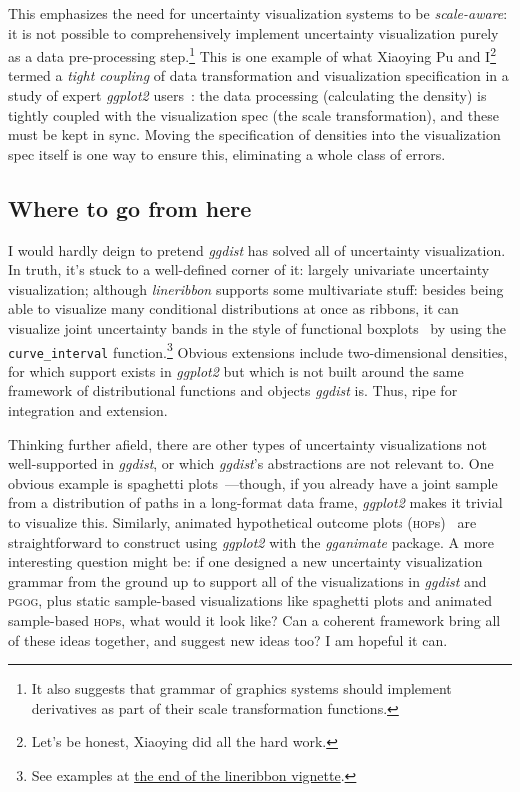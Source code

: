 \documentclass[journal]{vgtc}              %
\begin{document}
This emphasizes the need for uncertainty visualization systems to be \textit{scale-aware}: it is not possible to comprehensively implement uncertainty visualization purely as a data pre-processing step.\footnote{It also suggests that grammar of graphics systems should implement derivatives as part of their scale transformation functions.} This is one example of what Xiaoying Pu and I\footnote{Let's be honest, Xiaoying did all the hard work.} termed a \textit{tight coupling} of data transformation and visualization specification in a study of expert \textit{ggplot2} users~\cite{pu2023inpractice}: the data processing (calculating the density) is tightly coupled with the visualization spec (the scale transformation), and these must be kept in sync. Moving the specification of densities into the visualization spec itself is one way to ensure this, eliminating a whole class of errors. 


\subsection{Where to go from here}

I would hardly deign to pretend \textit{ggdist} has solved all of uncertainty visualization. In truth, it's stuck to a well-defined corner of it: largely univariate uncertainty visualization; although \textit{lineribbon} supports some multivariate stuff: besides being able to visualize many conditional distributions at once as ribbons, it can visualize joint uncertainty bands in the style of functional boxplots~\cite{sun2011functional,mirzargar2014curve,juul2021fixed} by using the \texttt{curve\_interval} function.\footnote{See examples at \href{https://mjskay.github.io/ggdist/articles/lineribbon.html\#curve-boxplots-aka-lineribbons-with-joint-intervals-or-curvewise-intervals}{the end of the lineribbon vignette}.} Obvious extensions include two-dimensional densities, for which support exists in \textit{ggplot2} but which is not built around the same framework of distributional functions and objects \textit{ggdist} is. Thus, ripe for integration and extension.

Thinking further afield, there are other types of uncertainty visualizations not well-supported in \textit{ggdist}, or which \textit{ggdist}'s abstractions are not relevant to. One obvious example is spaghetti plots~\cite{cox2013visualizing,liu2018visualizing}---though, if you already have a joint sample from a distribution of paths in a long-format data frame, \textit{ggplot2} makes it trivial to visualize this. Similarly, animated hypothetical outcome plots (\textsc{hop}s)~\cite{hullman2015hypothetical,kale2018hypothetical} are straightforward to construct using \textit{ggplot2} with the \textit{gganimate} package. A more interesting question might be: if one designed a new uncertainty visualization grammar from the ground up to support all of the  visualizations in \textit{ggdist} and \textsc{pgog}, plus static sample-based visualizations like spaghetti plots and animated sample-based \textsc{hop}s, what would it look like? Can a coherent framework bring all of these ideas together, and suggest new ideas too? I am hopeful it can.
\end{document}
